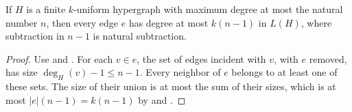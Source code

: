\begin{lemma}
If $H$ is a finite $k$-uniform hypergraph with maximum degree at most the
natural number $n$, then every edge $e$ has degree at most $k(n-1)$ in
$L(H)$, where subtraction in $n-1$ is natural subtraction.
\end{lemma}
\begin{proof}
Use  and .
For each $v\in e$, the set of edges incident with $v$, with $e$ removed,
has size $\deg_H(v)-1\le n-1$. Every neighbor of $e$ belongs to at
least one of these sets. The size of their union is at most the sum of
their sizes, which is at most $|e|(n-1)=k(n-1)$ by
 and .
\end{proof}
